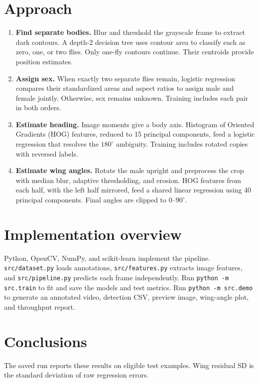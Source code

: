 \documentclass[11pt]{article}
\begin{document}
\section*{Approach}
\begin{enumerate}
\item \textbf{Find separate bodies.} Blur and threshold the grayscale frame to extract dark contours. A depth-2 decision tree uses contour area to classify each as zero, one, or two flies. Only one-fly contours continue. Their centroids provide position estimates.
\item \textbf{Assign sex.} When exactly two separate flies remain, logistic regression compares their standardized areas and aspect ratios to assign male and female jointly. Otherwise, sex remains unknown. Training includes each pair in both orders.
\item \textbf{Estimate heading.} Image moments give a body axis. Histogram of Oriented Gradients (HOG) features, reduced to 15 principal components, feed a logistic regression that resolves the $180^\circ$ ambiguity. Training includes rotated copies with reversed labels.
\item \textbf{Estimate wing angles.} Rotate the male upright and preprocess the crop with median blur, adaptive thresholding, and erosion. HOG features from each half, with the left half mirrored, feed a shared linear regression using 40 principal components. Final angles are clipped to $0$--$90^\circ$.
\end{enumerate}

\newpage
\section*{Implementation overview}
Python, OpenCV, NumPy, and scikit-learn implement the pipeline. \texttt{src/dataset.py} loads annotations, \texttt{src/features.py} extracts image features, and \texttt{src/pipeline.py} predicts each frame independently. Run \texttt{python -m src.train} to fit and save the models and test metrics. Run \texttt{python -m src.demo} to generate an annotated video, detection CSV, preview image, wing-angle plot, and throughput report.

\section*{Conclusions}
The saved run reports these results on eligible test examples. Wing residual SD is the standard deviation of raw regression errors.
\end{document}
